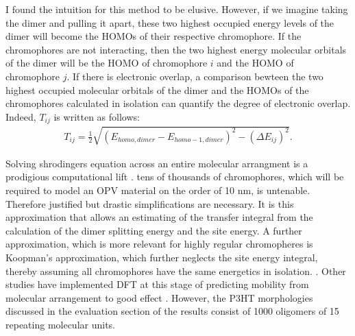 I found the intuition for this method to be elusive. However, if we imagine
taking the dimer and pulling it apart, these two highest occupied energy levels of the dimer 
will become the HOMOs of their respective chromophore. If the chromophores are not interacting, 
then the two highest energy molecular orbitals of the dimer will be the HOMO of chromophore $i$ and the 
HOMO of chromophore $j$. If there is electronic overlap, a comparison bewteen the two highest occupied
molecular orbitals of the dimer and the HOMOs of the chromophores calculated in isolation can quantify the degree of
electronic overlap. Indeed, $T_{ij}$ is written as follows:
\begin{align}
    T_{ij} = \frac{1}{2}\sqrt{ (E_{homo,dimer} - E_{homo-1,dimer})^{2} - (\Delta E_{ij})^{2} }.
\end{align}
 

Solving shrodingers equation across an entire molecular arrangment is a prodigious computational lift
. tens of thousands of 
chromophores, which will be required to model an OPV material on the order of 10 nm, is untenable. Therefore
justified but drastic simplifications are necessary.  It is this approximation that allows an estimating of the transfer integral from the calculation of
the dimer splitting energy and the site energy. A further approximation, which is more relevant for highly regular chromopheres is Koopman's
approximation, which further neglects the site energy integral, thereby assuming all chromophores have the same
energetics in isolation.  . Other studies have implemented DFT at this stage of predicting
mobility from molecular arrangement to good effect \cite{Deng2004}. However, the P3HT morphologies discussed in the evaluation section of the results
consist of 1000 oligomers of 15 repeating molecular units. 


